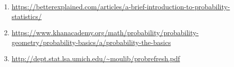 \documentclass[11pt]{article}
\begin{document}
\begin{enumerate}
\item \url{https://betterexplained.com/articles/a-brief-introduction-to-probability-statistics/}
\item \url{https://www.khanacademy.org/math/probability/probability-geometry/probability-basics/a/probability-the-basics}
\item \url{http://dept.stat.lsa.umich.edu/~moulib/probrefresh.pdf}
\end{enumerate}
\end{document}
